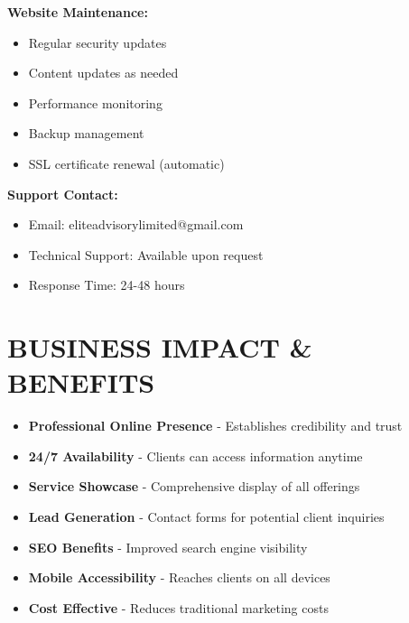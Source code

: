 \documentclass[11pt,a4paper]{article}
\begin{document}
\begin{detailsbox}
    \textbf{Website Maintenance:}
    \begin{itemize}
        \item Regular security updates
        \item Content updates as needed
        \item Performance monitoring
        \item Backup management
        \item SSL certificate renewal (automatic)
    \end{itemize}
    
    \vspace{0.5cm}
    
    \textbf{Support Contact:}
    \begin{itemize}
        \item Email: eliteadvisorylimited@gmail.com
        \item Technical Support: Available upon request
        \item Response Time: 24-48 hours
    \end{itemize}
\end{detailsbox}

\vspace{1cm}

\section*{\color{primaryBlue}BUSINESS IMPACT \& BENEFITS}

\begin{itemize}[leftmargin=2cm]
    \item \textbf{Professional Online Presence} - Establishes credibility and trust
    \item \textbf{24/7 Availability} - Clients can access information anytime
    \item \textbf{Service Showcase} - Comprehensive display of all offerings
    \item \textbf{Lead Generation} - Contact forms for potential client inquiries
    \item \textbf{SEO Benefits} - Improved search engine visibility
    \item \textbf{Mobile Accessibility} - Reaches clients on all devices
    \item \textbf{Cost Effective} - Reduces traditional marketing costs
\end{itemize}
\end{document}
